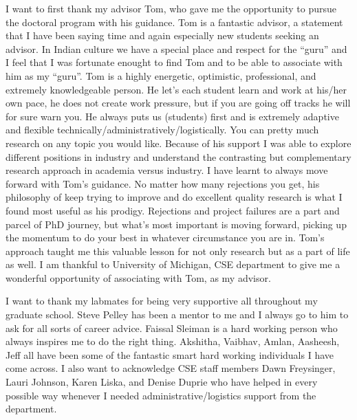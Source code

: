I want to first thank my advisor Tom, who gave me the opportunity to pursue the
doctoral program with his guidance. Tom is a fantastic advisor, a statement that
I have been saying time and again especially new students seeking an advisor. In
Indian culture we have a special place and respect for the ``guru'' and I feel
that I was fortunate enought to find Tom and to be able to associate with him as
my ``guru''. Tom is a highly energetic, optimistic, professional, and extremely
knowledgeable person. He let's each student learn and work at his/her own
pace, he does not create work pressure, but if you are going off tracks he will
for sure warn you. He always puts us (students) first and is extremely adaptive
and flexible technically/administratively/logistically. You can pretty much
research on any topic you would like. Because of his support I was able to
explore different positions in industry and understand the contrasting but
complementary research approach in academia versus industry. I have learnt to
always move forward with Tom's guidance. No matter how many rejections you get,
his philosophy of keep trying to improve and do excellent quality research is
what I found most useful as his prodigy. Rejections and project failures are a
part and parcel of PhD journey, but what's most important is moving forward,
picking up the momentum to do your best in whatever circumstance you are in.
Tom's approach taught me this valuable lesson for not only research but as a
part of life as well. I am thankful to University of Michigan, CSE department to
give me a wonderful opportunity of associating with Tom, as my advisor.

I want to thank my labmates for being very supportive all throughout my graduate
school. Steve Pelley has been a mentor to me and I always go to him to ask for
all sorts of career advice. Faissal Sleiman is a hard working person who always
inspires me to do the right thing. Akshitha, Vaibhav, Amlan, Aasheesh, Jeff all
have been some of the fantastic smart hard working individuals I have come
across. I also want to acknowledge CSE staff members Dawn Freysinger, Lauri
Johnson, Karen Liska, and Denise Duprie who have helped in every possible way
whenever I needed administrative/logistics support from the department.

